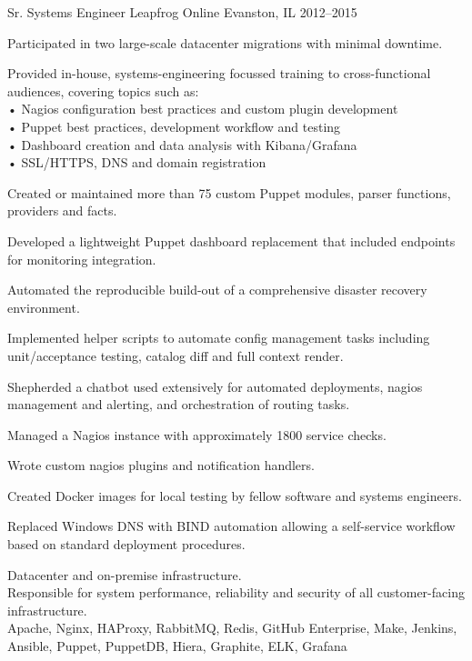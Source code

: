 \begin{cventries}
\newpage
{\vspace*{3ex} %
}

  \cventry
    {Sr. Systems Engineer} %
    {Leapfrog Online} %
    {Evanston, IL} %
    {2012--2015} %
    {
      \begin{cvitems} %
        \item {Participated in two large-scale datacenter migrations with minimal downtime.}
        \item {Provided in-house, systems-engineering focussed training to cross-functional audiences, covering topics such as: \\
              • Nagios configuration best practices and custom plugin development \\
              • Puppet best practices, development workflow and testing \\
              • Dashboard creation and data analysis with Kibana/Grafana \\
              • SSL/HTTPS, DNS and domain registration
        }
        \item {Created or maintained more than 75 custom Puppet modules, parser functions, providers and facts.}
        \item {Developed a lightweight Puppet dashboard replacement that included endpoints for monitoring integration.}
        \item {Automated the reproducible build-out of a comprehensive disaster recovery environment.}
        \item {Implemented helper scripts to automate config management tasks including unit/acceptance testing, catalog diff and full context render.}
        \item {Shepherded a chatbot used extensively for automated deployments, nagios management and alerting, and orchestration of routing tasks.}
        \item {Managed a Nagios instance with approximately 1800 service checks.}
        \item {Wrote custom nagios plugins and notification handlers.}
        \item {Created Docker images for local testing by fellow software and systems engineers.}
        \item {Replaced Windows DNS with BIND automation allowing a self-service workflow based on standard deployment procedures.}
      \end{cvitems}
    }
    {
      \begin{cventrysummary}
        Datacenter and on-premise infrastructure. \\
        Responsible for system performance, reliability and security of all customer-facing infrastructure. \\
        Apache, Nginx, HAProxy, RabbitMQ, Redis, GitHub Enterprise, Make, Jenkins, Ansible, Puppet, PuppetDB, Hiera, Graphite, ELK, Grafana
      \end{cventrysummary}
    }


\end{cventries}
